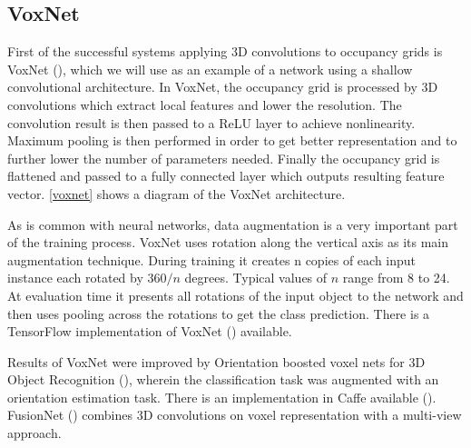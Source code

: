 \subsection{VoxNet}
First of the successful systems applying 3D convolutions to occupancy grids is VoxNet (\cite{maturana_voxnet:_2015}), which we will use as an example of a network using a shallow convolutional architecture. 
In VoxNet, the occupancy grid is processed by 3D convolutions which extract local features and lower the resolution. The convolution result is then passed to a ReLU layer to achieve nonlinearity. Maximum pooling is then performed in order to get better representation and to further lower the number of parameters needed. Finally the occupancy grid is flattened and passed to a fully connected layer which outputs resulting feature vector. \autoref{voxnet} shows a diagram of the VoxNet architecture.\par  
As is common with neural networks, data augmentation is a very important part of the training process. VoxNet uses rotation along the vertical axis as its main augmentation technique. During training it creates n copies of each input instance each rotated by $360/n$ degrees. Typical values of $n$ range from 8 to 24. At evaluation time it presents all rotations of the input object to the network and then uses pooling across the rotations to get the class prediction. There is a TensorFlow implementation of VoxNet (\cite{maturana_voxnet_2016}) available.\par
Results of VoxNet were improved by Orientation boosted voxel nets for 3D Object Recognition (\cite{sedaghat_orientation-boosted_2016}), wherein the classification task was augmented
with an orientation estimation task. There is an implementation in Caffe available (\cite{sedaghat_orion_2016}). FusionNet (\cite{hegde_fusionnet:_2016}) combines 3D convolutions on voxel representation with a multi-view approach.




